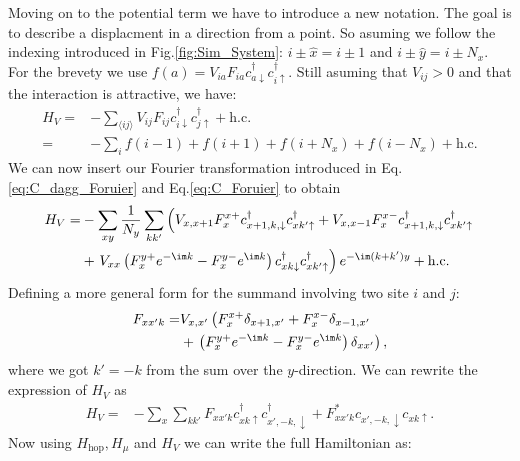 \documentclass[../main.tex]{subfile}
\begin{document}
Moving on to the potential term we have to introduce a new notation. The goal is to describe a displacment in a direction from a point. So asuming
we follow the indexing introduced in Fig.\ref{fig:Sim_System}: $i\pm\hat{x} = i\pm 1$ and $i\pm\hat{y} = i\pm N_x$.
For the brevety we use $f(a) = V_{ia}F_{ia} c^{\dagger}_{a\downarrow} c^{\dagger}_{i\uparrow}$. Still asuming that $V_{ij}>0$ and that the interaction is attractive, we have:
\begin{align*}
    H_V =& -\sum_{\langle ij\rangle} V_{ij} F_{ij} c^{\dagger}_{i\downarrow} c^{\dagger}_{j\uparrow} + \text{h.c.} \\
    =& -\sum_{i} f(i-1) + f(i+1) + f(i+N_x) + f(i-N_x) + \text{h.c.}
\end{align*}
We can now insert our Fourier transformation introduced in Eq.\ref{eq:C_dagg_Foruier} and Eq.\ref{eq:C_Foruier} to obtain
\begin{align*}
    H_V =& -\sum_{xy} \frac{1}{N_y} \sum_{kk'} \left( V_{x,x+1} F_{x}^{x+} c^{\dagger}_{x+1,k,\downarrow}c^{\dagger}_{xk'\uparrow} + V_{x,x-1} F_{x}^{x-} c^{\dagger}_{x+1,k,\downarrow} c^{\dagger}_{xk'\uparrow} \right.\\
        &+ \left.V_{xx}\left( F_{x}^{y+} e^{-\im k}  - F_{x}^{y-} e^{\im k}\right) c^{\dagger}_{xk\downarrow} c^{\dagger}_{xk'\uparrow} \right) e^{-\im(k + k')y} + \text{h.c.}\\
\end{align*}
Defining a more general form for the summand involving two site $i$ and $j$:
\begin{equation*}
    \begin{aligned}
    F_{xx'k} =&  V_{x,x'}\left( F_{x}^{x+} \delta_{x+1,x'} +  F_{x}^{x-} \delta_{x-1,x'}\right. \\
        &+ \left.\left( F_{x}^{y+} e^{-\im k}  - F_{x}^{y-} e^{\im k}\right)\delta_{xx'}\right),
    \end{aligned}
\end{equation*} 
where we got $k' = -k$ from the sum over the $y$-direction. We can rewrite the expression of $H_V$ as
\begin{align*}
    H_V =& -\sum_{x} \sum_{kk'} F_{xx'k} c^{\dagger}_{xk\uparrow} c^{\dagger}_{x',-k,\downarrow} + F_{xx'k}^{\ast} c_{x',-k,\downarrow} c_{xk\uparrow}.
\end{align*}
Now using $H_{\text{hop}}, H_{\mu}$ and $H_{V}$ we can write the full Hamiltonian as:
\end{document}
